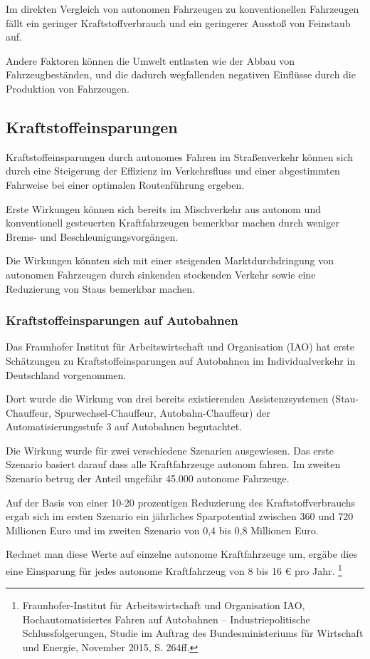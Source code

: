 Im direkten Vergleich von autonomen Fahrzeugen zu konventionellen Fahrzeugen
fällt ein geringer Kraftstoffverbrauch und ein geringerer Ausstoß von Feinstaub auf.

Andere Faktoren können die Umwelt entlasten wie der Abbau von Fahrzeugbeständen,
und die dadurch wegfallenden negativen Einflüsse durch die Produktion von Fahrzeugen.

\subsection{Kraftstoffeinsparungen}
Kraftstoffeinsparungen durch autonomes Fahren im Straßenverkehr können sich durch
eine Steigerung der Effizienz im Verkehrsfluss und
einer abgestimmten Fahrweise bei einer optimalen Routenführung ergeben.

Erste Wirkungen können sich bereits im Mischverkehr aus autonom und konventionell gesteuerten Kraftfahrzeugen bemerkbar machen durch weniger
Brems- und Beschleunigungsvorgängen.

Die Wirkungen könnten sich mit einer steigenden Marktdurchdringung von autonomen Fahrzeugen
durch sinkenden stockenden Verkehr sowie eine Reduzierung von Staus bemerkbar machen.

\subsubsection{Kraftstoffeinsparungen auf Autobahnen}
Das Fraunhofer Institut für Arbeitswirtschaft und Organisation (IAO) hat erste Schätzungen zu Kraftstoffeinsparungen auf Autobahnen im Individualverkehr in Deutschland vorgenommen.

Dort wurde die Wirkung von drei bereits existierenden Assistenzsystemen (Stau-Chauffeur, Spurwechsel-Chauffeur, Autobahn-Chauffeur)
der Automatisierungsstufe 3 auf Autobahnen begutachtet.

Die Wirkung wurde für zwei verschiedene Szenarien ausgewiesen.
Das erste Szenario basiert darauf dass alle Kraftfahrzeuge autonom fahren.
Im zweiten Szenario betrug der Anteil ungefähr 45.000 autonome Fahrzeuge.

Auf der Basis von einer 10-20 prozentigen Reduzierung des Kraftstoffverbrauchs ergab sich
im ersten Szenario ein jährliches Sparpotential zwischen 360 und 720 Millionen Euro und
im zweiten Szenario von 0,4 bis 0,8 Millionen Euro.

Rechnet man diese Werte auf einzelne autonome Kraftfahrzeuge um,
ergäbe dies eine Einsparung für jedes autonome Kraftfahrzeug von 8 bis 16 € pro Jahr.
\footnote{Fraunhofer-Institut für Arbeitswirtschaft und Organisation IAO, Hochautomatisiertes
	Fahren auf Autobahnen – Industriepolitische Schlussfolgerungen, Studie im Auftrag des
	Bundesministeriums für Wirtschaft und Energie, November 2015, S. 264ff.}

